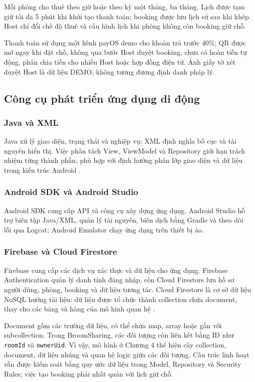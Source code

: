Mỗi phòng cho thuê theo giờ hoặc theo kỳ một tháng, ba tháng. Lịch được tạm giữ tối đa 5 phút khi khởi tạo thanh toán; booking được lưu lịch sử sau khi khép. Host chỉ đổi chế độ thuê và cấu hình lịch khi phòng không còn booking giữ chỗ.

Thanh toán sử dụng một kênh payOS demo cho khoản trả trước 40\%; QR được mở ngay khi đặt chỗ, không qua bước Host duyệt booking, chưa có hoàn tiền tự động, phân chia tiền cho nhiều Host hoặc hợp đồng điện tử. Ảnh giấy tờ xét duyệt Host là dữ liệu DEMO, không tương đương định danh pháp lý.

\subsection{Công cụ phát triển ứng dụng di động}
\subsubsection{Java và XML}
Java xử lý giao diện, trạng thái và nghiệp vụ; XML định nghĩa bố cục và tài nguyên hiển thị. Việc phân tách View, ViewModel và Repository giới hạn trách nhiệm từng thành phần, phù hợp với định hướng phân lớp giao diện và dữ liệu trong kiến trúc Android \parencite{android_arch}.

\subsubsection{Android SDK và Android Studio}
Android SDK cung cấp API và công cụ xây dựng ứng dụng. Android Studio hỗ trợ biên tập Java/XML, quản lý tài nguyên, biên dịch bằng Gradle và theo dõi lỗi qua Logcat; Android Emulator chạy ứng dụng trên thiết bị ảo.

\subsubsection{Firebase và Cloud Firestore}
\label{sec:ch1-nosql}
Firebase cung cấp các dịch vụ xác thực và dữ liệu cho ứng dụng. Firebase Authentication quản lý danh tính đăng nhập, còn Cloud Firestore lưu hồ sơ người dùng, phòng, booking và dữ liệu tương tác. Cloud Firestore là cơ sở dữ liệu NoSQL hướng tài liệu: dữ liệu được tổ chức thành collection chứa document, thay cho các bảng và hàng của mô hình quan hệ \parencite{firebase_data_model}.

Document gồm các trường dữ liệu, có thể chứa map, array hoặc gắn với subcollection. Trong BroomSharing, các đối tượng còn liên kết bằng ID như \texttt{roomId} và \texttt{ownerUid}. Vì vậy, mô hình ở Chương 4 thể hiện cây collection, document, dữ liệu nhúng và quan hệ logic giữa các đối tượng. Cấu trúc linh hoạt vẫn được kiểm soát bằng quy ước dữ liệu trong Model, Repository và Security Rules; việc tạo booking phải nhất quán với lịch giữ chỗ.

